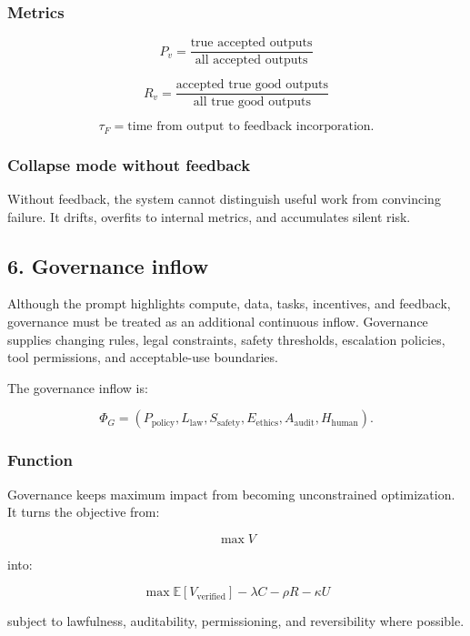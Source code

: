 \subsubsection{Metrics}\label{metrics-4}

\[
P_v=\frac{\text{true accepted outputs}}{\text{all accepted outputs}}
\]

\[
R_v=\frac{\text{accepted true good outputs}}{\text{all true good outputs}}
\]

\[
\tau_F=\text{time from output to feedback incorporation}.
\]

\subsubsection{Collapse mode without
feedback}\label{collapse-mode-without-feedback}

Without feedback, the system cannot distinguish useful work from
convincing failure. It drifts, overfits to internal metrics, and
accumulates silent risk.

\subsection{6. Governance inflow}\label{governance-inflow}

Although the prompt highlights compute, data, tasks, incentives, and
feedback, governance must be treated as an additional continuous inflow.
Governance supplies changing rules, legal constraints, safety
thresholds, escalation policies, tool permissions, and acceptable-use
boundaries.

The governance inflow is:

\[
\Phi_G=(P_{\text{policy}},L_{\text{law}},S_{\text{safety}},E_{\text{ethics}},A_{\text{audit}},H_{\text{human}}).
\]

\subsubsection{Function}\label{function-5}

Governance keeps maximum impact from becoming unconstrained
optimization. It turns the objective from:

\[
\max V
\]

into:

\[
\max \mathbb{E}[V_{\text{verified}}]-\lambda C-\rho R-\kappa U
\]

subject to lawfulness, auditability, permissioning, and reversibility
where possible.

